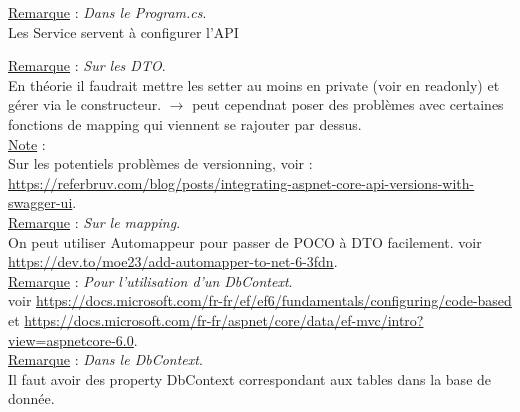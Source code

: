 \documentclass[a4paper,12pt,twoside]{article}
\newcommand{\incode}[1]{{\footnotesize\ttfamily #1}} %
\newcommand{\rem}[2]{\noindent\underline{Remarque} : \textit{#1}.\\ \indent #2}
\newcommand{\note}[1]{\noindent\underline{Note} : \\ \indent #1}
\begin{document}
\rem{Dans le Program.cs}{Les \incode{Service} servent à configurer l'API}

\rem{Sur les DTO}{En théorie il faudrait mettre les setter au moins en private (voir en readonly) et gérer via le constructeur. $\to$ peut cependnat poser des problèmes avec certaines fonctions de mapping qui viennent se rajouter par dessus.}\\

\note{Sur les potentiels problèmes de versionning, voir : \url{https://referbruv.com/blog/posts/integrating-aspnet-core-api-versions-with-swagger-ui}.}\\

\rem{Sur le mapping}{On peut utiliser Automappeur pour passer de POCO à DTO facilement. voir \url{https://dev.to/moe23/add-automapper-to-net-6-3fdn}.}\\

\rem{Pour l'utilisation d'un DbContext}{voir \url{https://docs.microsoft.com/fr-fr/ef/ef6/fundamentals/configuring/code-based} et \url{https://docs.microsoft.com/fr-fr/aspnet/core/data/ef-mvc/intro?view=aspnetcore-6.0}.}\\

\rem{Dans le DbContext}{Il faut avoir des property DbContext correspondant aux tables dans la base de donnée.}\\

\newpage
\printglossary[type=\acronymtype]%
\glsaddallunused %
\printglossary[type = main,nonumberlist]%
\end{document}

